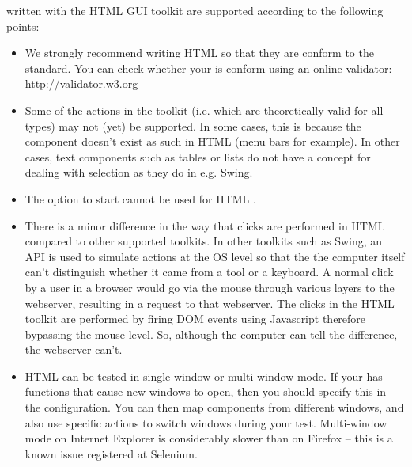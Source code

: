 \gdauts{} written with the HTML GUI toolkit are supported according to the following points:

\begin{itemize}
\item We strongly recommend writing HTML \gdauts{} so that they are conform to the  standard. You can check whether your \gdaut{} is  conform using an online validator: http://validator.w3.org
\item Some of the  actions in the  toolkit (i.e. which are theoretically valid for all \gdaut{} types) may not (yet) be supported. In some cases, this is because the component doesn't exist as such in HTML \gdauts{} (menu bars for example). In other cases, text components such as tables or lists do not have a concept for dealing with selection as they do in e.g. Swing. 
\item The  option to start \gdauts{}  cannot be used for HTML \gdauts{}. 
\item There is a minor difference in the way that clicks are performed in HTML compared to other supported toolkits. In other toolkits such as Swing, an API is used to simulate actions at the OS level so that the the computer itself can't distinguish whether it came from a tool or a keyboard. A normal click by a user in a browser would go via the mouse through various layers to the webserver, resulting in a request to that webserver. The clicks in the HTML toolkit are performed by firing DOM events using Javascript therefore bypassing the mouse level. So, although the computer can tell the difference, the webserver can't. 
\item HTML \gdauts{} can be tested in single-window or multi-window mode. If your \gdaut{} has functions that cause new windows to open, then you should specify this in the \gdaut{} configuration. You can then map components from different windows, and also use specific actions to switch windows during your test. Multi-window mode on Internet Explorer is considerably slower than on Firefox -- this is a known issue registered at Selenium.
\end{itemize}
